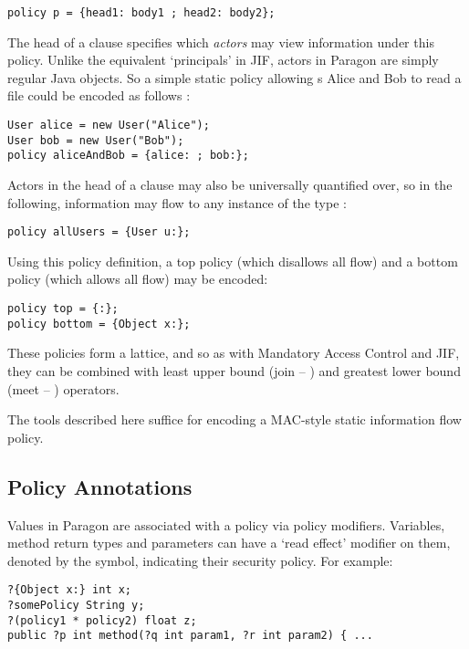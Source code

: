 \begin{verbatim}
policy p = {head1: body1 ; head2: body2};
\end{verbatim}

The head of a clause specifies which \textit{actors} may view information under this policy. Unlike the equivalent `principals' in JIF, actors in Paragon are simply regular Java objects. So a simple static policy allowing s Alice and Bob to read a file could be encoded as follows \cite{broberg2013paragon}:

\begin{verbatim}
User alice = new User("Alice");
User bob = new User("Bob");
policy aliceAndBob = {alice: ; bob:};
\end{verbatim}

Actors in the head of a clause may also be universally quantified over, so in the following, information may flow to any instance of the type :

\begin{verbatim}
policy allUsers = {User u:};
\end{verbatim}

Using this policy definition, a top policy (which disallows all flow) and a bottom policy (which allows all flow) may be encoded:

\begin{verbatim}
policy top = {:};
policy bottom = {Object x:};
\end{verbatim}

These policies form a lattice, and so as with Mandatory Access Control and JIF, they can be combined with least upper bound (join -- \mono{+}) and greatest lower bound (meet -- \mono{*}) operators.

The tools described here suffice for encoding a MAC-style static information flow policy.

\subsection{Policy Annotations}

Values in Paragon are associated with a policy via policy modifiers. Variables, method return types and parameters can have a `read effect' modifier on them, denoted by the  symbol, indicating their security policy. For example:

\begin{verbatim}
?{Object x:} int x;
?somePolicy String y;
?(policy1 * policy2) float z;
public ?p int method(?q int param1, ?r int param2) { ...
\end{verbatim}

